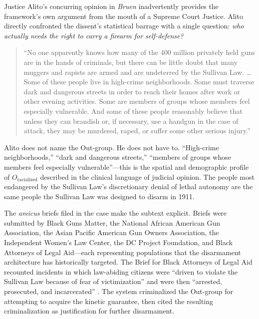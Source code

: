 \documentclass[12pt,openany]{book}
\begin{document}
Justice Alito's concurring opinion in \textit{Bruen} inadvertently provides the framework's own argument from the mouth of a Supreme Court Justice. Alito directly confronted the dissent's statistical barrage with a single question: \textit{who actually needs the right to carry a firearm for self-defense?}

\begin{quote}
``No one apparently knows how many of the 400 million privately held guns are in the hands of criminals, but there can be little doubt that many muggers and rapists are armed and are undeterred by the Sullivan Law. \ldots Some of these people live in high-crime neighborhoods. Some must traverse dark and dangerous streets in order to reach their homes after work or other evening activities. Some are members of groups whose members feel especially vulnerable. And some of these people reasonably believe that unless they can brandish or, if necessary, use a handgun in the case of attack, they may be murdered, raped, or suffer some other serious injury.'' \cite{bruen}
\end{quote}

Alito does not name the Out-group. He does not have to. ``High-crime neighborhoods,'' ``dark and dangerous streets,'' ``members of groups whose members feel especially vulnerable''---this is the spatial and demographic profile of $O_{\text{racialized}}$ described in the clinical language of judicial opinion. The people most endangered by the Sullivan Law's discretionary denial of lethal autonomy are the same people the Sullivan Law was designed to disarm in 1911.

The \textit{amicus} briefs filed in the case make the subtext explicit. Briefs were submitted by Black Guns Matter, the National African American Gun Association, the Asian Pacific American Gun Owners Association, the Independent Women's Law Center, the DC Project Foundation, and Black Attorneys of Legal Aid---each representing populations that the disarmament architecture has historically targeted. The Brief for Black Attorneys of Legal Aid recounted incidents in which law-abiding citizens were ``driven to violate the Sullivan Law because of fear of victimization'' and were then ``arrested, prosecuted, and incarcerated'' \cite{bruen}. The system criminalized the Out-group for attempting to acquire the kinetic guarantee, then cited the resulting criminalization as justification for further disarmament.
\end{document}
